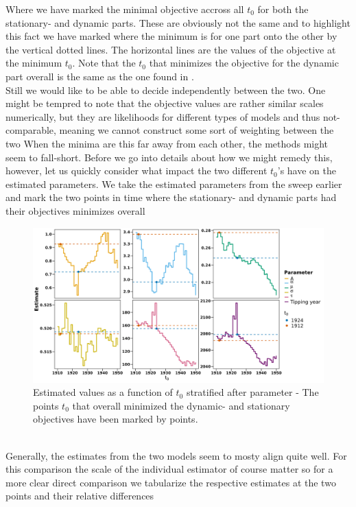 Where we have marked the minimal objective accross all $t_0$ for both the stationary- and dynamic parts. These are obviously not the same and to highlight this fact we have marked where the minimum is for one part onto the other by the vertical dotted lines. The horizontal lines are the values of the objective at the minimum $t_0$. Note that the $t_0$ that minimizes the objective for the dynamic part overall is the same as the one found in \cite{Ditlevsen2023}.\\
Still we would like to be able to decide independently between the two. One might be tempred to note that the objective values are rather similar scales numerically, but they are likelihoods for different types of models and thus not-comparable, meaning we cannot construct some sort of weighting between the two
When the minima are this far away from each other, the methods might seem to fall-short. Before we go into details about how we might remedy this, however, let us quickly consider what impact the two different $t_0$'s have on the estimated parameters. We take the estimated parameters from the sweep earlier and mark the two points in time where the stationary- and dynamic parts had their objectives minimizes overall
\begin{figure}[h!]
    \begin{center}
        \includegraphics[scale = .09]{figures/estimators_full_plot.jpeg}
        \caption{Estimated values as a function of $t_0$ stratified after parameter - The points $t_0$ that overall minimized the dynamic- and stationary objectives have been marked by points.}
    \end{center}
    \label{figure:AMOC_estimates_t_0}
\end{figure}\\
Generally, the estimates from the two models seem to mosty align quite well. For this comparison the scale of the individual estimator of course matter so for a more clear direct comparison we tabularize the respective estimates at the two points and their relative differences
